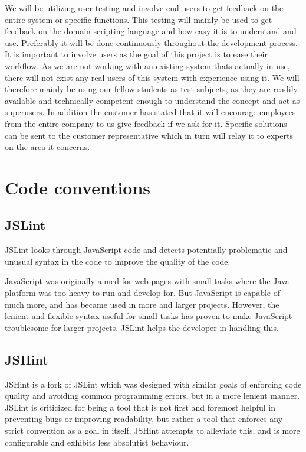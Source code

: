 We will be utilizing user testing and involve end users to get feedback on the entire system or specific functions. This testing will mainly be used to get feedback on the domain scripting language and how easy it is to understand and use. Preferably it will be done continuously throughout the development process. It is important to involve users as the goal of this project is to ease their workflow. As we are not working with an existing system thats actually in use, there will not exist any real users of this system with experience using it. We will therefore mainly be using our fellow students as test subjects, as they are readily available and technically competent enough to understand the concept and act as superusers. In addition the customer has stated that it will encourage employees from the entire company to us give feedback if we ask for it. Specific solutions can be sent to the customer representative which in turn will relay it to experts on the area it concerns.

\section{Code conventions}
\subsection*{JSLint}
JSLint looks through JavaScript code and detects potentially problematic and unusual syntax in the code to improve the quality of the code. 

JavaScript was originally aimed for web pages with small tasks where the Java platform was too heavy to run and develop for. But JavaScript is capable of much more, and has became used in more and larger projects. However, the lenient and flexible syntax useful for small tasks has proven to make JavaScript troublesome for larger projects. JSLint helps the developer in handling this. \cite{jslint-about}

\subsection*{JSHint}
JSHint is a fork of JSLint which was designed with similar goals of enforcing code quality and avoiding common programming errors, but in a more lenient manner. JSLint is criticized for being a tool that is not first and foremost helpful in preventing bugs or improving readability, but rather a tool that enforces any strict convention as a goal in itself. JSHint attempts to alleviate this, and is more configurable and exhibits less absolutist behaviour. \cite{jshint-about}
